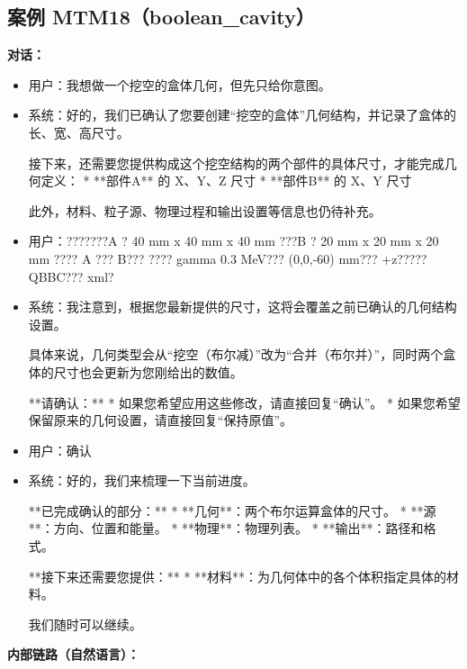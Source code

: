 \documentclass[11pt]{ctexart}
\begin{document}
\subsection{案例 MTM18（boolean\_cavity）}
\textbf{对话：}
\begin{itemize}
\item 用户：我想做一个挖空的盒体几何，但先只给你意图。
\item 系统：好的，我们已确认了您要创建“挖空的盒体”几何结构，并记录了盒体的长、宽、高尺寸。

接下来，还需要您提供构成这个挖空结构的两个部件的具体尺寸，才能完成几何定义：
*   **部件A** 的 X、Y、Z 尺寸
*   **部件B** 的 X、Y 尺寸

此外，材料、粒子源、物理过程和输出设置等信息也仍待补充。
\item 用户：???????A ? 40 mm x 40 mm x 40 mm ???B ? 20 mm x 20 mm x 20 mm ???? A ??? B??? ???? gamma 0.3 MeV??? (0,0,-60) mm??? +z????? QBBC??? xml?
\item 系统：我注意到，根据您最新提供的尺寸，这将会覆盖之前已确认的几何结构设置。

具体来说，几何类型会从“挖空（布尔减）”改为“合并（布尔并）”，同时两个盒体的尺寸也会更新为您刚给出的数值。

**请确认：**
*   如果您希望应用这些修改，请直接回复“确认”。
*   如果您希望保留原来的几何设置，请直接回复“保持原值”。
\item 用户：确认
\item 系统：好的，我们来梳理一下当前进度。

**已完成确认的部分：**
*   **几何**：两个布尔运算盒体的尺寸。
*   **源**：方向、位置和能量。
*   **物理**：物理列表。
*   **输出**：路径和格式。

**接下来还需要您提供：**
*   **材料**：为几何体中的各个体积指定具体的材料。

我们随时可以继续。
\end{itemize}
\textbf{内部链路（自然语言）：}
\end{document}
